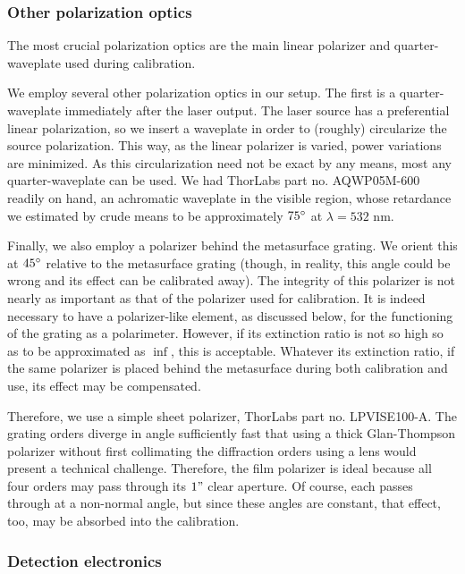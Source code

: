 \documentclass[footinbib,aps,prl,superscriptaddress]{revtex4-1}
\begin{document}
\subsubsection{Other polarization optics}

The most crucial polarization optics are the main linear polarizer and quarter-waveplate used during calibration.

We employ several other polarization optics in our setup. The first is a quarter-waveplate immediately after the laser output. The laser source has a preferential linear polarization, so we insert a waveplate in order to (roughly) circularize the source polarization. This way, as the linear polarizer is varied, power variations are minimized. As this circularization need not be exact by any means, most any quarter-waveplate can be used. We had ThorLabs part no. AQWP05M-600 readily on hand, an achromatic waveplate in the visible region, whose retardance we estimated by crude means to be approximately $75\degree$ at $\lambda=532$ nm.

Finally, we also employ a polarizer behind the metasurface grating. We orient this at $45\degree$ relative to the metasurface grating (though, in reality, this angle could be wrong and its effect can be calibrated away). The integrity of this polarizer is not nearly as important as that of the polarizer used for calibration. It is indeed necessary to have a polarizer-like element, as discussed below, for the functioning of the grating as a polarimeter. However, if its extinction ratio is not so high so as to be approximated as $\inf$, this is acceptable. Whatever its extinction ratio, if the same polarizer is placed behind the metasurface during both calibration and use, its effect may be compensated.

Therefore, we use a simple sheet polarizer, ThorLabs part no. LPVISE100-A. The grating orders diverge in angle sufficiently fast that using a thick Glan-Thompson polarizer without first collimating the diffraction orders using a lens would present a technical challenge. Therefore, the film polarizer is ideal because all four orders may pass through its $1"$ clear aperture. Of course, each passes through at a non-normal angle, but since these angles are constant, that effect, too, may be absorbed into the calibration.

\subsubsection{Detection electronics}
\end{document}
